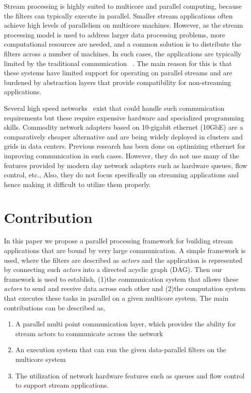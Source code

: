 \documentclass[10pt, conference, compsocconf, reqno]{IEEEtran}
\begin{document}
Stream processing is highly suited to multicore and parallel
computing, because the filters can typically execute in parallel.
Smaller stream applications often achieve high levels of parallelism
on multicore machines.  However, as the stream processing model
is used to address larger data processing problems, more computational
resources are needed, and a common solution is to distribute the
filters across a number of machines.
In such cases, the applications are typically limited by the
traditional communication
~\cite{Wu:2007:PPB:1323954.1323957,Wu:2007:PAL:1227865.1228021,Dobrescu09routebricks:exploiting,Han:2010:PGS:1851275.1851207,Kohler2000}.
The main reason for this is that these systems have limited support for operating on
parallel streams and are burdened by abstraction layers that provide
compatibility for non-streaming applications.

Several high speed networks~\cite{fredj2011survey} exist that could handle such communication requirements but these require expensive hardware and specialized programming skills. Commodity network adapters based on 10-gigabit ethernet (10GbE) are a comparatively cheaper alternative and are being widely deployed in clusters and grids in data centers. Previous research\cite{Romanow03anoverview,Feng:2003:OEN:1048935.1050200} has been done on optimizing ethernet for improving communication in such cases. However, they do not use many of the features provided by modern day network adapters such as hardware queues, flow control, etc., Also, they do not focus specifically on streaming applications and hence making it difficult to utilize them properly.

\section{Contribution}

In this paper we propose a parallel processing framework for building stream applications that are bound by very large communication. A simple framework is used, where the filters are described as \textit{actors} and the application is represented by connecting such \textit{actors} into a directed acyclic graph (DAG). Then our framework is used to establish, (1)the communication system that allows these \textit{actors} to send and receive data across each other and (2)the computation system that executes these tasks in parallel on a given multicore system. The main contributions can be described as,

\begin{enumerate}
\item A parallel multi point communication layer, which provides the ability for stream actors to communicate across the network
\item An execution system that can run the given data-parallel filters on the multicore system
\item The utilization of network hardware features such as queues and flow control to support stream applications.

\end{enumerate}
\end{document}
